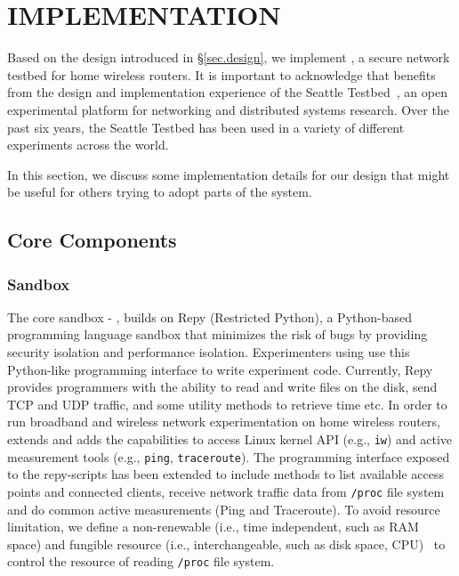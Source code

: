 \chapter{IMPLEMENTATION} 
\label{sec.implementation}
Based on the design introduced in \S{\ref{sec.design}}, we implement \sysname, a secure network testbed for home wireless routers. It is important to acknowledge that \sysname benefits from the design and implementation experience of the Seattle Testbed~\cite{cappos2009seattle}, an open experimental platform for networking and distributed systems research. Over the past six years, the Seattle Testbed has been used in a variety of different experiments across the world. 

In this section, we discuss some implementation details for our design that might be useful for others trying to adopt parts of the system.

\section{Core Components}
\subsection{Sandbox}
\label{sec.sandbox}
The core sandbox - \sandboxname, builds on Repy (Restricted Python), a Python-based programming language sandbox that minimizes the risk of bugs by providing security isolation and performance isolation. Experimenters using \sysname use this Python-like programming interface to write experiment code. Currently, Repy provides programmers with the ability to read and write files on the disk, send TCP and UDP traffic, and some utility methods to retrieve time etc. In order to run broadband and wireless network experimentation on home wireless routers, \sysname extends and adds the capabilities to access Linux kernel API (e.g., \texttt{iw}) and active measurement tools (e.g., \texttt{ping}, \texttt{traceroute}). The programming interface exposed to the repy-scripts has been extended to include methods to list available access points and connected clients, receive network traffic data from \texttt{/proc} file system and do common active measurements (Ping and Traceroute). To avoid resource limitation, we define a non-renewable (i.e., time independent, such as RAM space) and fungible resource (i.e., interchangeable, such as disk space, CPU)~\cite{li2015fence} to control the resource of reading \texttt{/proc} file system. 

